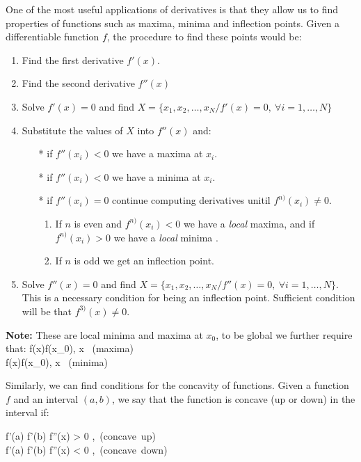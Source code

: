One of the most useful applications of derivatives is that they allow us
to find properties of functions such as maxima, minima and inflection points. Given a differentiable
function $f$, the procedure to find these points would be:

\begin{enumerate}
	\item Find the first derivative $f'(x)$.
	\item Find the second derivative $f''(x)$
	\item Solve $f'(x)=0$ and find $X=\{x_1,x_2,\ldots,x_N / f'(x)=0,\ \forall i=1,\ldots,N\}$
	\item Substitute the values of $X$ into $f''(x)$ and:
	\begin{enumerate}
		 \item[*] if $f''(x_i)<0$ we have a maxima at $x_i$.
    	 \item[*] if $f''(x_i)<0$ we have a minima at $x_i$.
    	 \item[*] if $f''(x_i)=0$ continue computing derivatives unitil $f^{n)}(x_i)\neq 0$.
    	 \begin{enumerate}
    	 	\item If $n$ is even and $f^{n)}(x_i)< 0$ we have a {\em local} maxima, and if
    	 	$f^{n)}(x_i)> 0$ we have a {\em local} minima .
    	 	\item If  $n$ is odd we get an inflection point.
    	 \end{enumerate}
	\end{enumerate}
	\item Solve  $f''(x)=0$ and find $X=\{x_1,x_2,\ldots,x_N / f''(x)=0,\ \forall i=1,\ldots,N\}$. This is a necessary condition for being an inflection point. Sufficient condition will be that $f^{3)}(x)\neq 0$.
\end{enumerate}

{\bf Note: } These are local minima and maxima at $x_0$, to be global we further require that:
\bnn
	f(x)\leq f(x_0), \quad \forall x \mbox{ (maxima)}\\
		f(x)\geq f(x_0), \quad \forall x \mbox{ (minima)}	
\enn

Similarly, we can find conditions for the concavity of functions. Given a function $f$ and an interval $(a,b)$, we say that the function is concave (up or down) in the interval if:

\bnn
	f'(a) \leq f'(b) \Rightarrow f''(x) > 0 \mbox{, (concave up)} \\
		f'(a) \geq f'(b) \Rightarrow f''(x) < 0 \mbox{, (concave down)}
\enn

